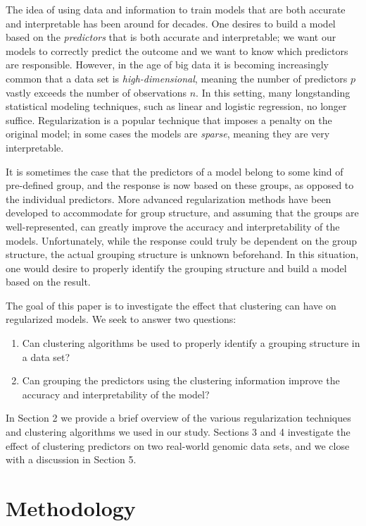 \documentclass[11pt]{article}
\begin{document}

The idea of using data and information to train models that are both accurate and interpretable has been around for decades. One desires to build a model based on the \textit{predictors} that is both accurate and interpretable; we want our models to correctly predict the outcome and we want to know which predictors are responsible. However, in the age of big data it is becoming increasingly common that a data set is \textit{high-dimensional}, meaning the number of predictors $p$ vastly exceeds the number of observations $n$. In this setting, many longstanding statistical modeling techniques, such as linear and logistic regression, no longer suffice. Regularization is a popular technique that imposes a penalty on the original model; in some cases the models are \textit{sparse}, meaning they are very interpretable.

It is sometimes the case that the predictors of a model belong to some kind of pre-defined group, and the response is now based on these groups, as opposed to the individual predictors. More advanced regularization methods have been developed to accommodate for group structure, and assuming that the groups are well-represented, can greatly improve the accuracy and interpretability of the models. Unfortunately, while the response could truly be dependent on the group structure, the actual grouping structure is unknown beforehand. In this situation, one would desire to properly identify the grouping structure and build a model based on the result.

The goal of this paper is to investigate the effect that clustering can have on regularized models. We seek to answer two questions:
\begin{enumerate}
    \item Can clustering algorithms be used to properly identify a grouping structure in a data set?
    \item Can grouping the predictors using the clustering information improve the accuracy and interpretability of the model?
\end{enumerate}
In Section 2 we provide a brief overview of the various regularization techniques and clustering algorithms we used in our study. Sections 3 and 4 investigate the effect of clustering predictors on two real-world genomic data sets, and we close with a discussion in Section 5.

\section{Methodology}
\end{document}
